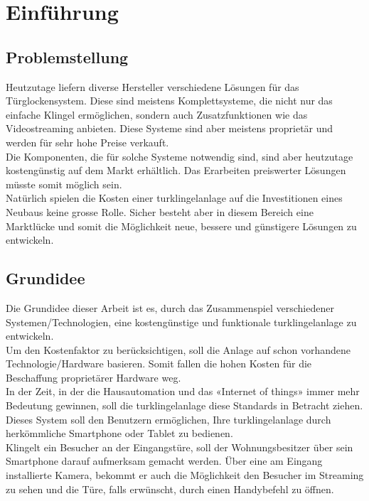 \section{Einführung}
\label{sec:chapterexample}

\subsection{Problemstellung}
\label{sec:chapterexample}

Heutzutage liefern diverse Hersteller verschiedene Lösungen für das Türglockensystem. Diese sind meistens Komplettsysteme, die nicht nur das einfache Klingel ermöglichen, sondern auch Zusatzfunktionen wie das Videostreaming anbieten. Diese Systeme sind aber meistens proprietär und werden für sehr hohe Preise verkauft.
\\
Die Komponenten, die für solche Systeme notwendig sind, sind aber heutzutage kostengünstig auf dem Markt erhältlich. Das Erarbeiten preiswerter Lösungen müsste somit möglich sein. 
\\
Natürlich spielen die Kosten einer \gls{turklingelanlage} auf die Investitionen eines Neubaus keine grosse Rolle. Sicher besteht aber in diesem Bereich eine Marktlücke und somit die Möglichkeit neue, bessere und günstigere Lösungen zu entwickeln.  

\subsection{Grundidee}
\label{sec:grundidee}

Die Grundidee dieser Arbeit ist es, durch das Zusammenspiel verschiedener Systemen/Technologien, eine kostengünstige und funktionale \gls{turklingelanlage} zu entwickeln.
\\ 
Um den Kostenfaktor zu berücksichtigen, soll die Anlage auf schon vorhandene Technologie/Hardware basieren. Somit fallen die hohen Kosten für die Beschaffung proprietärer Hardware weg.
\\
In der Zeit, in der die Hausautomation und das «Internet of things» immer mehr Bedeutung gewinnen, soll die \gls{turklingelanlage} diese Standards in Betracht ziehen.   
Dieses System soll den Benutzern ermöglichen, Ihre \gls{turklingelanlage} durch herkömmliche Smartphone oder Tablet zu bedienen.
\\
Klingelt ein Besucher an der Eingangstüre, soll der Wohnungsbesitzer über sein Smartphone darauf aufmerksam gemacht werden. Über eine am Eingang installierte Kamera, bekommt er auch die Möglichkeit den Besucher im Streaming zu sehen und die Türe, falls erwünscht, durch einen Handybefehl zu öffnen.

\newpage
